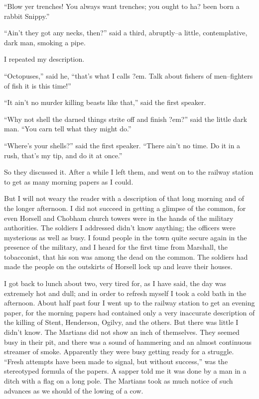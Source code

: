 ``Blow yer trenches! You always want trenches; you ought to ha? been
born a rabbit Snippy.''

``Ain't they got any necks, then?'' said a third, abruptly--a little,
contemplative, dark man, smoking a pipe.

I repeated my description.

``Octopuses,'' said he, ``that's what I calls ?em. Talk about fishers
of men--fighters of fish it is this time!''

``It ain't no murder killing beasts like that,'' said the first
speaker.

``Why not shell the darned things strite off and finish ?em?'' said
the little dark man. ``You carn tell what they might do.''

``Where's your shells?'' said the first speaker. ``There ain't no
time. Do it in a rush, that's my tip, and do it at once.''

So they discussed it. After a while I left them, and went on to the
railway station to get as many morning papers as I could.

But I will not weary the reader with a description of that long
morning and of the longer afternoon. I did not succeed in getting a
glimpse of the common, for even Horsell and Chobham church towers
were in the hands of the military authorities. The soldiers I
addressed didn't know anything; the officers were mysterious as
well as busy. I found people in the town quite secure again in the
presence of the military, and I heard for the first time from
Marshall, the tobacconist, that his son was among the dead on the
common. The soldiers had made the people on the outskirts of
Horsell lock up and leave their houses.

I got back to lunch about two, very tired for, as I have said, the
day was extremely hot and dull; and in order to refresh myself I
took a cold bath in the afternoon. About half past four I went up
to the railway station to get an evening paper, for the morning
papers had contained only a very inaccurate description of the
killing of Stent, Henderson, Ogilvy, and the others. But there was
little I didn't know. The Martians did not show an inch of
themselves. They seemed busy in their pit, and there was a sound of
hammering and an almost continuous streamer of smoke. Apparently
they were busy getting ready for a struggle. ``Fresh attempts have
been made to signal, but without success,'' was the stereotyped
formula of the papers. A sapper told me it was done by a man in a
ditch with a flag on a long pole. The Martians took as much notice
of such advances as we should of the lowing of a cow.

